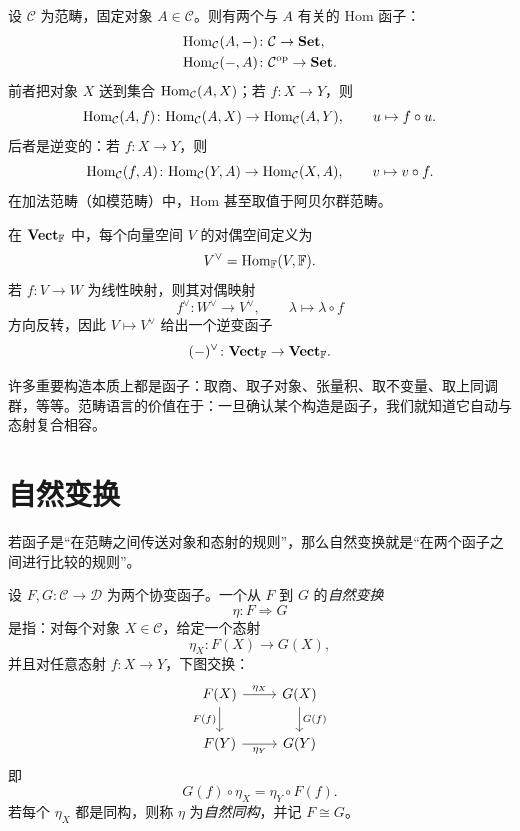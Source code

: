 \begin{example}[Hom 函子]
设 $\mathcal C$ 为范畴，固定对象 $A\in \mathcal C$。则有两个与 $A$ 有关的 Hom 函子：
\begin{align*}
  \mathrm{Hom}_{\mathcal C}(A,-)&\colon \mathcal C\to \mathbf{Set},\\
  \mathrm{Hom}_{\mathcal C}(-,A)&\colon \mathcal C^{\mathrm{op}}\to \mathbf{Set}.
\end{align*}
前者把对象 $X$ 送到集合 $\mathrm{Hom}_{\mathcal C}(A,X)$；若 $f\colon X\to Y$，则
\[
  \mathrm{Hom}_{\mathcal C}(A,f)\colon \mathrm{Hom}_{\mathcal C}(A,X)\to \mathrm{Hom}_{\mathcal C}(A,Y),
  \qquad u\mapsto f\circ u.
\]
后者是逆变的：若 $f\colon X\to Y$，则
\[
  \mathrm{Hom}_{\mathcal C}(f,A)\colon \mathrm{Hom}_{\mathcal C}(Y,A)\to \mathrm{Hom}_{\mathcal C}(X,A),
  \qquad v\mapsto v\circ f.
\]
在加法范畴（如模范畴）中，Hom 甚至取值于阿贝尔群范畴。
\end{example}

\begin{example}[对偶函子]
在 $\mathbf{Vect}_{\mathbb{F}}$ 中，每个向量空间 $V$ 的对偶空间定义为
\[
  V^{\vee}=\mathrm{Hom}_{\mathbb{F}}(V,\mathbb{F}).
\]
若 $f\colon V\to W$ 为线性映射，则其对偶映射
\[
  f^{\vee}\colon W^{\vee}\to V^{\vee},
  \qquad \lambda\mapsto \lambda\circ f
\]
方向反转，因此 $V\mapsto V^{\vee}$ 给出一个逆变函子
\[
  (-)^{\vee}\colon \mathbf{Vect}_{\mathbb{F}}\to \mathbf{Vect}_{\mathbb{F}}.
\]
\end{example}

\begin{remark}
许多重要构造本质上都是函子：取商、取子对象、张量积、取不变量、取上同调群，等等。范畴语言的价值在于：一旦确认某个构造是函子，我们就知道它自动与态射复合相容。
\end{remark}

\section{自然变换}

若函子是“在范畴之间传送对象和态射的规则”，那么自然变换就是“在两个函子之间进行比较的规则”。

\begin{definition}
设 $F,G\colon \mathcal C\to \mathcal D$ 为两个协变函子。一个从 $F$ 到 $G$ 的\emph{自然变换}
\[
  \eta\colon F\Rightarrow G
\]
是指：对每个对象 $X\in \mathcal C$，给定一个态射
\[
  \eta_X\colon F(X)\to G(X),
\]
并且对任意态射 $f\colon X\to Y$，下图交换：
\[
\begin{tikzcd}
F(X) \arrow[r,"{\eta_X}"] \arrow[d,"{F(f)}"'] & G(X) \arrow[d,"{G(f)}"] \\
F(Y) \arrow[r,"{\eta_Y}"'] & G(Y)
\end{tikzcd}
\]
即
\[
  G(f)\circ \eta_X = \eta_Y\circ F(f).
\]
若每个 $\eta_X$ 都是同构，则称 $\eta$ 为\emph{自然同构}，并记 $F\cong G$。
\end{definition}

